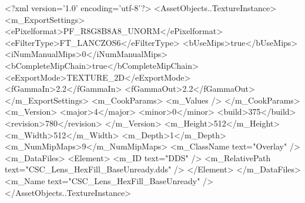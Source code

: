 <?xml version='1.0' encoding='utf-8'?>
<AssetObjects..TextureInstance>
  <m_ExportSettings>
    <ePixelformat>PF_R8G8B8A8_UNORM</ePixelformat>
    <eFilterType>FT_LANCZOS6</eFilterType>
    <bUseMips>true</bUseMips>
    <iNumManualMips>0</iNumManualMips>
    <bCompleteMipChain>true</bCompleteMipChain>
    <eExportMode>TEXTURE_2D</eExportMode>
    <fGammaIn>2.2</fGammaIn>
    <fGammaOut>2.2</fGammaOut>
  </m_ExportSettings>
  <m_CookParams>
    <m_Values />
  </m_CookParams>
  <m_Version>
    <major>4</major>
    <minor>0</minor>
    <build>375</build>
    <revision>780</revision>
  </m_Version>
  <m_Height>512</m_Height>
  <m_Width>512</m_Width>
  <m_Depth>1</m_Depth>
  <m_NumMipMaps>9</m_NumMipMaps>
  <m_ClassName text="Overlay" />
  <m_DataFiles>
    <Element>
      <m_ID text="DDS" />
      <m_RelativePath text="CSC_Lens_HexFill_BaseUnready.dds" />
    </Element>
  </m_DataFiles>
  <m_Name text="CSC_Lens_HexFill_BaseUnready" />
</AssetObjects..TextureInstance>
